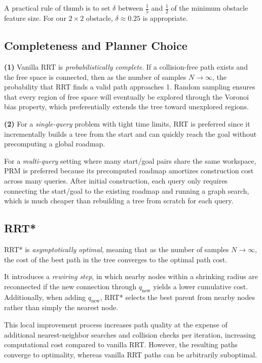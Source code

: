 \documentclass[11pt]{article}
\begin{document}
A practical rule of thumb is to set $\delta$ between $\frac{1}{5}$ and $\frac{1}{2}$ of the minimum obstacle feature size. For our $2 \times 2$ obstacle, $\delta \approx 0.25$ is appropriate.

\subsection{Completeness and Planner Choice}

\textbf{(1)} Vanilla RRT is \textit{probabilistically complete}. If a collision-free path exists and the free space is connected, then as the number of samples $N \to \infty$, the probability that RRT finds a valid path approaches 1. Random sampling ensures that every region of free space will eventually be explored through the Voronoi bias property, which preferentially extends the tree toward unexplored regions.

\textbf{(2)} For a \textit{single-query} problem with tight time limits, RRT is preferred since it incrementally builds a tree from the start and can quickly reach the goal without precomputing a global roadmap. 

For a \textit{multi-query} setting where many start/goal pairs share the same workspace, PRM is preferred because its precomputed roadmap amortizes construction cost across many queries. After initial construction, each query only requires connecting the start/goal to the existing roadmap and running a graph search, which is much cheaper than rebuilding a tree from scratch for each query.

\subsection{RRT*}

RRT* is \textit{asymptotically optimal}, meaning that as the number of samples $N \to \infty$, the cost of the best path in the tree converges to the optimal path cost. 

It introduces a \textit{rewiring step}, in which nearby nodes within a shrinking radius are reconnected if the new connection through $q_{\text{new}}$ yields a lower cumulative cost. Additionally, when adding $q_{\text{new}}$, RRT* selects the best parent from nearby nodes rather than simply the nearest node. 

This local improvement process increases path quality at the expense of additional nearest-neighbor searches and collision checks per iteration, increasing computational cost compared to vanilla RRT. However, the resulting paths converge to optimality, whereas vanilla RRT paths can be arbitrarily suboptimal.
\end{document}

